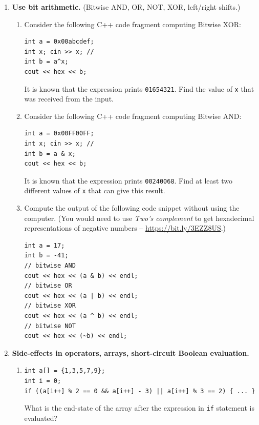 \documentclass[a4paper,12pt]{article}
\begin{document}
\begin{enumerate}[label=1.\Alph*.]
\item {\bf Use bit arithmetic.} (Bitwise AND, OR, NOT, XOR, left/right shifts.)
\begin{enumerate}
\item Consider the following C++ code fragment computing Bitwise XOR:
\begin{verbatim}
int a = 0x00abcdef;
int x; cin >> x; // 
int b = a^x;
cout << hex << b;
\end{verbatim}
It is known that the expression prints {\tt 01654321}. 
Find the value of {\tt x} that was received from the input.
\item Consider the following C++ code fragment computing Bitwise AND:
\begin{verbatim}
int a = 0x00FF00FF;
int x; cin >> x; // 
int b = a & x;
cout << hex << b;
\end{verbatim}
It is known that the expression prints {\tt 00240068}. 
Find at least two different values of {\tt x} that can give this result.
\item Compute the output of the following code snippet 
without using the computer. (You would need to 
use {\em Two's complement} to get hexadecimal representations
of negative numbers -- \url{https://bit.ly/3EZZ8US}.)
\begin{verbatim}
int a = 17;
int b = -41;
// bitwise AND
cout << hex << (a & b) << endl;
// bitwise OR  
cout << hex << (a | b) << endl;
// bitwise XOR
cout << hex << (a ^ b) << endl;
// bitwise NOT
cout << hex << (~b) << endl;
\end{verbatim}


\end{enumerate}

\item {\bf Side-effects in operators, arrays, short-circuit Boolean evaluation.}
\begin{enumerate}
\item 
\begin{verbatim}
int a[] = {1,3,5,7,9};
int i = 0; 
if ((a[i++] % 2 == 0 && a[i++] - 3) || a[i++] % 3 == 2) { ... }
\end{verbatim}
What is the end-state of the array after the expression in 
{\tt if} statement is evaluated?
\end{enumerate}


\end{enumerate}
\end{document}
